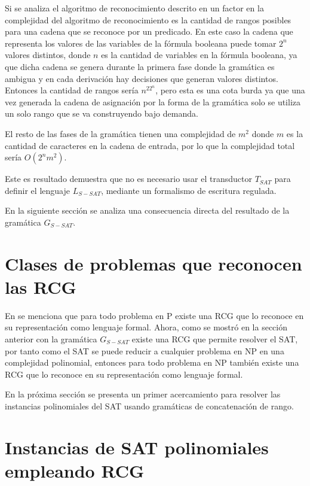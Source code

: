 Si se analiza el algoritmo de reconocimiento descrito en \cite{mainRCGBib}
un factor en la complejidad del algoritmo de reconocimiento es la cantidad de rangos posibles para una cadena
que se reconoce por un predicado. En este caso la cadena que representa los valores de las variables de la
fórmula booleana puede tomar $2^n$ valores distintos, donde $n$ es la cantidad de variables en la fórmula booleana,
ya que dicha cadena se genera durante la primera fase donde la gramática es ambigua y en cada derivación hay
decisiones que generan valores distintos.
Entonces la cantidad de rangos sería $n^22^n$, pero esta es una cota burda ya que una vez generada
la cadena de asignación por la forma de la gramática solo se utiliza un solo rango que se va construyendo
bajo demanda.

El resto de las fases de la gramática tienen una complejidad de $m^2$ donde $m$ es la cantidad de caracteres
en la cadena de entrada, por lo que la complejidad total sería $O(2^nm^2)$.

Este es resultado demuestra que no es necesario usar el transductor $T_{SAT}$ para definir el lenguaje $L_{S-SAT}$, mediante un formalismo de escritura regulada.

En la siguiente sección se analiza una consecuencia directa del resultado de la gramática $G_{S-SAT}$.

\section{Clases de problemas que reconocen las RCG}

En \cite{propertiesRCGBib2} se menciona que para todo problema en P existe una RCG que lo reconoce en su representación como
lenguaje formal. Ahora, como se mostró en la sección anterior con la gramática $G_{S-SAT}$ existe una RCG que permite resolver el SAT, por tanto como el SAT se puede reducir a cualquier problema en NP en una complejidad polinomial, entonces para todo problema en NP también existe una RCG que lo reconoce en su representación como lenguaje formal.

En la próxima sección se presenta un primer acercamiento para resolver las instancias polinomiales del SAT usando gramáticas
de concatenación de rango.

\section{Instancias de SAT polinomiales empleando RCG}

